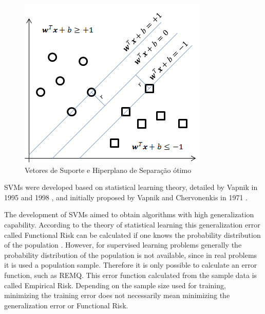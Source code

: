 \begin{figure}[h]
	\centering 
	\includegraphics[width=.6\textwidth]{image/svm.png}
	\caption{Vetores de Suporte e Hiperplano de Separação ótimo}
	\label{fig:svm}
\end{figure}

SVMs were developed based on statistical learning theory, detailed by Vapnik in 1995 and 1998 \cite{vapnikSnature} \cite{vapnik1998statistical}, and initially proposed by Vapnik and Chervonenkis in 1971 \cite{vapnik1971uniform}.

The development of SVMs aimed to obtain algorithms with high generalization capability. According to the theory of statistical learning this generalization error called Functional Risk can be calculated if one knows the probability distribution of the population \cite{vapnik1998statistical}. However, for supervised learning problems generally the probability distribution of the population is not available, since in real problems it is used a population sample. Therefore it is only possible to calculate an error function, such as REMQ. This error function calculated from the sample data is called Empirical Risk. Depending on the sample size used for training, minimizing the training error does not necessarily mean minimizing the generalization error or Functional Risk.

